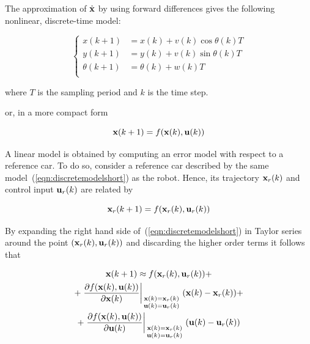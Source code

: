 \documentclass[conference]{IEEEtran} %
\begin{document}
The approximation of $\dot{\bf x}$ by using forward differences gives the
following nonlinear, discrete-time model:

\begin{equation}
\label{eqn:discretemodel}
	\left\{
		\begin{aligned}
			x(k+1)	    &= x(k) + v(k)\cos\theta(k)T \\
			y(k+1)	    &= y(k) + v(k)\sin\theta(k)T \\
			\theta(k+1) &= \theta(k) + w(k)T \\
		\end{aligned}
	\right.
\end{equation}

\noindent where $T$ is the sampling period and $k$ is the time step.

\noindent or, in a more compact form

\begin{equation}
	{\bf x}(k+1) = f({\bf x}(k),{\bf u}(k))
\label{eqn:discretemodelshort}
\end{equation}

A linear model is obtained by computing an error model with respect to a
reference car. To do so, consider a reference car described by the same
model~(\ref{eqn:discretemodelshort}) as the robot. Hence, its trajectory
${\bf x}_r(k)$ and control input ${\bf u}_r(k)$ are related by

\begin{equation}
{\bf x}_r(k+1)=f({\bf x}_r(k),{\bf u}_r(k))
\label{eqn:referencecar}
\end{equation}

By expanding the right hand side of~(\ref{eqn:discretemodelshort}) in Taylor
series around the point $({\bf x}_r(k),{\bf u}_r(k))$ and discarding the
higher order terms it follows that

\begin{multline}
\label{eqn:taylor}
{\bf x}(k+1) \approx f({\bf x}_r(k),{\bf u}_r(k)) + \\
 + \left.\frac{\partial f({\bf x}(k),{\bf u}(k))}{\partial{\bf x}(k)}\right|_{\begin{smallmatrix}{\bf x}(k)={\bf x}_r(k) \\
{\bf u}(k)={\bf u}_r(k) \end{smallmatrix}}({\bf x}(k)-{\bf x}_r(k)) + \\
+ \left.\frac{\partial f({\bf x}(k),{\bf u}(k))}{\partial{\bf u}(k)}\right|_{\begin{smallmatrix}{\bf x}(k)={\bf x}_r(k) \\
{\bf u}(k)={\bf u}_r(k) \end{smallmatrix}}({\bf u}(k)-{\bf u}_r(k))
\end{multline}
\end{document}
